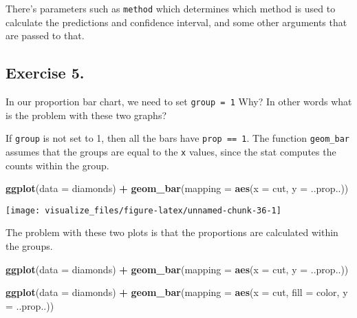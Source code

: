 \documentclass[]{book}
\newenvironment{Shaded}{\begin{snugshade}}{\end{snugshade}}
\newcommand{\DataTypeTok}[1]{\textcolor[rgb]{0.13,0.29,0.53}{#1}}
\newcommand{\KeywordTok}[1]{\textcolor[rgb]{0.13,0.29,0.53}{\textbf{#1}}}
\newcommand{\NormalTok}[1]{#1}
\newcommand{\OperatorTok}[1]{\textcolor[rgb]{0.81,0.36,0.00}{\textbf{#1}}}
\newcommand{\StringTok}[1]{\textcolor[rgb]{0.31,0.60,0.02}{#1}}
\theoremstyle{plain}
\theoremstyle{remark}
\theoremstyle{definition}
\theoremstyle{definition}
\theoremstyle{definition}
\theoremstyle{remark}
\begin{document}
There's parameters such as \texttt{method} which determines which method
is used to calculate the predictions and confidence interval, and some
other arguments that are passed to that.

\hypertarget{exercise-5.-1}{%
\subsection{Exercise 5.}\label{exercise-5.-1}}

In our proportion bar chart, we need to set \texttt{group\ =\ 1} Why? In
other words what is the problem with these two graphs?

If \texttt{group} is not set to 1, then all the bars have
\texttt{prop\ ==\ 1}. The function \texttt{geom\_bar} assumes that the
groups are equal to the \texttt{x} values, since the stat computes the
counts within the group.

\begin{Shaded}
\begin{Highlighting}[]
\KeywordTok{ggplot}\NormalTok{(}\DataTypeTok{data =}\NormalTok{ diamonds) }\OperatorTok{+}
\StringTok{  }\KeywordTok{geom_bar}\NormalTok{(}\DataTypeTok{mapping =} \KeywordTok{aes}\NormalTok{(}\DataTypeTok{x =}\NormalTok{ cut, }\DataTypeTok{y =}\NormalTok{ ..prop..))}
\end{Highlighting}
\end{Shaded}

\begin{center}\texttt{[image: visualize\_files/figure-latex/unnamed-chunk-36-1]} \end{center}

The problem with these two plots is that the proportions are calculated
within the groups.

\begin{Shaded}
\begin{Highlighting}[]
\KeywordTok{ggplot}\NormalTok{(}\DataTypeTok{data =}\NormalTok{ diamonds) }\OperatorTok{+}
\StringTok{  }\KeywordTok{geom_bar}\NormalTok{(}\DataTypeTok{mapping =} \KeywordTok{aes}\NormalTok{(}\DataTypeTok{x =}\NormalTok{ cut, }\DataTypeTok{y =}\NormalTok{ ..prop..))}

\KeywordTok{ggplot}\NormalTok{(}\DataTypeTok{data =}\NormalTok{ diamonds) }\OperatorTok{+}
\StringTok{  }\KeywordTok{geom_bar}\NormalTok{(}\DataTypeTok{mapping =} \KeywordTok{aes}\NormalTok{(}\DataTypeTok{x =}\NormalTok{ cut, }\DataTypeTok{fill =}\NormalTok{ color, }\DataTypeTok{y =}\NormalTok{ ..prop..))}
\end{Highlighting}
\end{Shaded}
\end{document}
